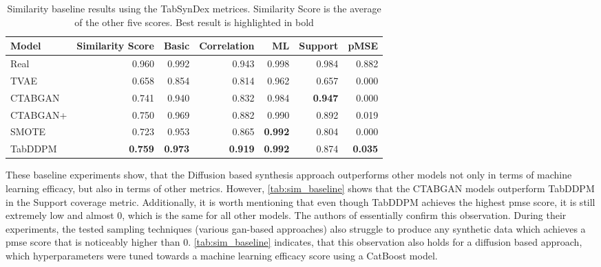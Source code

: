 \begin{table}[h]
	\centering
	\begin{tabular}{lrrrrrr}
		\toprule
		\textbf{Model} & \textbf{Similarity Score} & \textbf{Basic} & \textbf{Correlation} & \textbf{ML}    & \textbf{Support} & \textbf{pMSE}   \\
		\midrule
		Real           & 0.960                     & 0.992          & 0.943                & 0.998          & 0.984            & 0.882           \\
		TVAE           & 0.658                     & 0.854          & 0.814                & 0.962          & 0.657            & 0.000           \\
		CTABGAN        & 0.741                     & 0.940          & 0.832                & 0.984          & \textbf{0.947}   & 0.000           \\
		CTABGAN+       & 0.750                     & 0.969          & 0.882                & 0.990          & 0.892            & 0.019           \\
		SMOTE          & 0.723                     & 0.953          & 0.865                & \textbf{0.992} & 0.804            & 0.000           \\
		TabDDPM        & \textbf{0.759}            & \textbf{0.973} & \textbf{0.919}       & \textbf{0.992} & 0.874            & \textbf{0.035}  \\
		\bottomrule
	\end{tabular}
	\caption[Similarity baseline]{Similarity baseline results using the TabSynDex metrices. Similarity Score is the average of the other five scores. Best result is highlighted in bold}
	\label{tab:sim_baseline}
\end{table}

These baseline experiments show, that the Diffusion based synthesis approach outperforms other models not only in terms of machine learning efficacy, but also in terms of other metrics.
However, \autoref{tab:sim_baseline} shows that the CTABGAN models outperform TabDDPM in the Support coverage metric.
Additionally, it is worth mentioning that even though TabDDPM achieves the highest \gls{pmse} score, it is still extremely low and almost 0, which is the same for all other models.
The authors of \cite{chundawat2022UniversalMetricRobust} essentially confirm this observation.
During their experiments, the tested sampling techniques (various \gls{gan}-based approaches) also struggle to produce any synthetic data which achieves a \gls{pmse} score that is noticeably higher than 0.
\autoref{tab:sim_baseline} indicates, that this observation also holds for a diffusion based approach, which hyperparameters were tuned towards a machine learning efficacy score using a CatBoost model.


